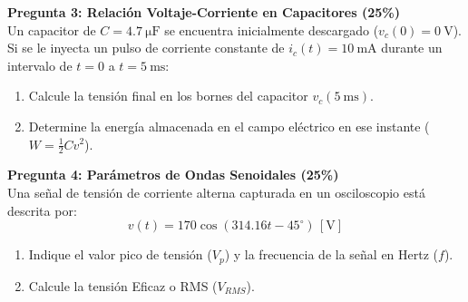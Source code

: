 \documentclass[11pt,a4paper]{article}
\begin{document}
\vspace{0.5cm}
\noindent \textbf{Pregunta 3: Relación Voltaje-Corriente en Capacitores (25\%)} \\
Un capacitor de $C = \SI{4.7}{\micro\farad}$ se encuentra inicialmente descargado ($v_c(0) = \SI{0}{\volt}$). Si se le inyecta un pulso de corriente constante de $i_c(t) = \SI{10}{\milli\ampere}$ durante un intervalo de $t = 0$ a $t = \SI{5}{\milli\second}$:
\begin{enumerate}
    \item Calcule la tensión final en los bornes del capacitor $v_c(\SI{5}{\milli\second})$.
    \item Determine la energía almacenada en el campo eléctrico en ese instante ($W = \frac{1}{2} C v^2$).
\end{enumerate}

\vspace{0.5cm}
\noindent \textbf{Pregunta 4: Parámetros de Ondas Senoidales (25\%)} \\
Una señal de tensión de corriente alterna capturada en un osciloscopio está descrita por:
$$v(t) = 170 \cos(314.16 t - 45^\circ) \, [\unit{\volt}]$$
\begin{enumerate}
    \item Indique el valor pico de tensión ($V_p$) y la frecuencia de la señal en Hertz ($f$).
    \item Calcule la tensión Eficaz o RMS ($V_{RMS}$).
\end{enumerate}
\end{document}
